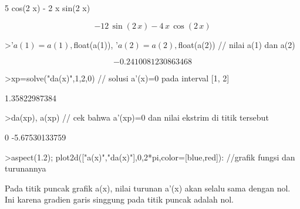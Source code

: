 \documentclass[a4paper,10pt]{article}
\begin{document}
\begin{eulernotebook}
\begin{eulercomment}
\begin{eulercomment}
\begin{euleroutput}
                        5 cos(2 x) - 2 x sin(2 x)
  
\end{euleroutput}
\begin{eulerformula}
\[
-12\,\sin \left(2\,x\right)-4\,x\,\cos \left(2\,x\right)
\]
\end{eulerformula}
\begin{eulerprompt}
>$’a(1)=a(1), $float(a(1)), $’a(2)=a(2), $float(a(2)) // nilai a(1) dan a(2)
\end{eulerprompt}
\begin{eulerformula}
\[
-0.2410081230863468
\]
\end{eulerformula}
\begin{eulerprompt}
>xp=solve("da(x)",1,2,0) // solusi a'(x)=0 pada interval [1, 2]
\end{eulerprompt}
\begin{euleroutput}
  1.35822987384
\end{euleroutput}
\begin{eulerprompt}
>da(xp), a(xp) // cek bahwa a'(xp)=0 dan nilai ekstrim di titik tersebut
\end{eulerprompt}
\begin{euleroutput}
  0
  -5.67530133759
\end{euleroutput}
\begin{eulerprompt}
>aspect(1.2); plot2d(["a(x)","da(x)"],0,2*pi,color=[blue,red]): //grafik fungsi dan turunannya
\end{eulerprompt}
\begin{eulercomment}
Pada titik puncak grafik a(x), nilai turunan a'(x) akan selalu sama
dengan nol. Ini karena gradien garis singgung pada titik puncak adalah
nol.


\end{eulercomment}
\end{eulercomment}
\end{eulercomment}
\end{eulernotebook}
\end{document}
